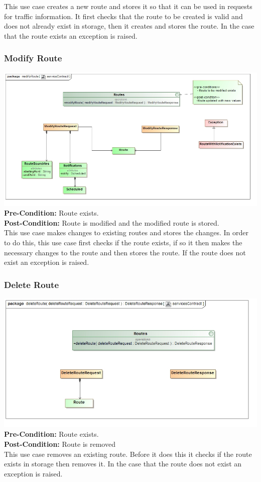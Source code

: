 \documentclass[a4paper,12pt]{article}
\begin{document}
This use case creates a new route and stores it so that it can be used in requests for traffic information. It first checks that the route to be created is valid and does not already exist in storage, then it creates and stores the route. In the case that the route exists an exception is raised.
\subsubsection{Modify Route} 
\includegraphics[width=\textwidth]{images/scModify_Route.jpg}
\textbf{Pre-Condition: }
Route exists.\\
\textbf{Post-Condition: }
Route is modified and the modified route is stored.\\

This use case makes changes to existing routes and stores the changes. In order to do this, this use case first checks if the route exists, if so it then makes the necessary changes to the route and then stores the route. If the route does not exist an exception is raised. 
\subsubsection{Delete Route}
\includegraphics[width=\textwidth]{images/scDelete_Route.jpg}
\textbf{Pre-Condition: }
Route exists.\\
\textbf{Post-Condition: }
Route is removed\\
This use case removes an existing route. Before it does this it checks if the route exists in storage then removes it. In the case that the route does not exist an exception is raised.
\end{document}

